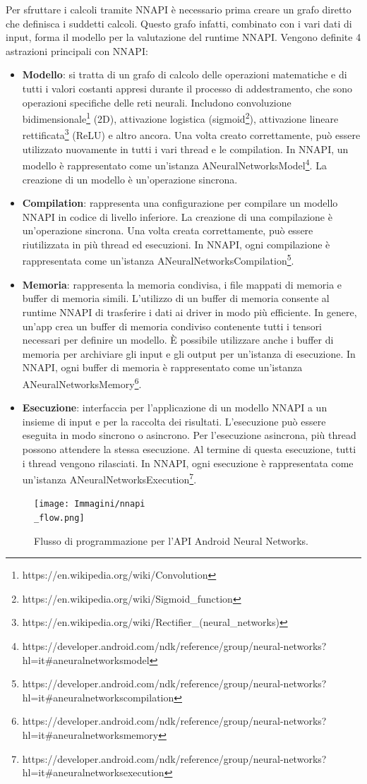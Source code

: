 Per sfruttare i calcoli tramite NNAPI è necessario prima creare un grafo diretto che definisca i suddetti calcoli. Questo grafo infatti, combinato con
i vari dati di input, forma il modello per la valutazione del runtime NNAPI. Vengono definite 4 astrazioni principali con NNAPI:
\begin{itemize}
    \item \textbf{Modello}: si tratta di un grafo di calcolo delle operazioni matematiche e di tutti i valori costanti appresi durante il processo
    di addestramento, che sono operazioni specifiche delle reti neurali. Includono convoluzione bidimensionale\footnote{https://en.wikipedia.org/wiki/Convolution}
    (2D), attivazione logistica (sigmoid\footnote{https://en.wikipedia.org/wiki/Sigmoid\_function}), attivazione lineare rettificata\footnote{https://en.wikipedia.org/wiki/Rectifier\_(neural\_networks)}
    (ReLU) e altro ancora. Una volta creato correttamente, può essere utilizzato nuovamente in tutti i vari thread e le compilation. In NNAPI, un modello
    è rappresentato come un'istanza ANeuralNetworksModel\footnote{https://developer.android.com/ndk/reference/group/neural-networks?hl=it\#aneuralnetworksmodel}.
    La creazione di un modello è un'operazione sincrona.
    \item \textbf{Compilation}: rappresenta una configurazione per compilare un modello NNAPI in codice di livello inferiore. La creazione di una
    compilazione è un'operazione sincrona. Una volta creata correttamente, può essere riutilizzata in più thread ed esecuzioni. In NNAPI, ogni
    compilazione è rappresentata come un'istanza ANeuralNetworksCompilation\footnote{https://developer.android.com/ndk/reference/group/neural-networks?hl=it\#aneuralnetworkscompilation}.
    \item \textbf{Memoria}: rappresenta la memoria condivisa, i file mappati di memoria e buffer di memoria simili. L'utilizzo di un buffer di memoria
    consente al runtime NNAPI di trasferire i dati ai driver in modo più efficiente. In genere, un'app crea un buffer di memoria condiviso contenente
    tutti i tensori necessari per definire un modello. È possibile utilizzare anche i buffer di memoria per archiviare gli input e gli output per un'istanza di
    esecuzione. In NNAPI, ogni buffer di memoria è rappresentato come un'istanza ANeuralNetworksMemory\footnote{https://developer.android.com/ndk/reference/group/neural-networks?hl=it\#aneuralnetworksmemory}.
    \item \textbf{Esecuzione}: interfaccia per l'applicazione di un modello NNAPI a un insieme di input e per la raccolta dei risultati. L'esecuzione
    può essere eseguita in modo sincrono o asincrono. Per l'esecuzione asincrona, più thread possono attendere la stessa esecuzione. Al termine di questa
    esecuzione, tutti i thread vengono rilasciati. In NNAPI, ogni esecuzione è rappresentata come un'istanza ANeuralNetworksExecution\footnote{https://developer.android.com/ndk/reference/group/neural-networks?hl=it\#aneuralnetworksexecution}.
\end{itemize}

\begin{figure}[ht]
    \centering
    \texttt{[image: Immagini/nnapi\\\_flow.png]}
    \caption{Flusso di programmazione per l'API Android Neural Networks.}
    \label{}
\end{figure}



